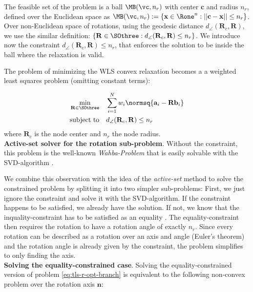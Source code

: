 The feasible set of the problem is a ball $\MB(\vc, n_r)$ with center $\mathbf{c}$ and radius $n_r$, defined over the Euclidean space as $\MB(\vc, n_r) :=\{\mathbf{x} \in \Rone^n : || \mathbf{c} - \mathbf{x}|| \leq n_r \}$. Over non-Euclidean space of rotations, using the geodesic distance $d_{\angle}(\mathbf{R}_c, \mathbf{R})$, we use the similar definition: $\{\mathbf{R} \in \SOthree : d_{\angle}(\mathbf{R}_c, \mathbf{R}) \leq n_r\}$. 
We introduce now the constraint 
$d_{\angle}(\mathbf{R}_c, \mathbf{R}) \leq n_r$, that enforces the solution to be inside the ball where the relaxation is valid. 

The problem of minimizing the WLS convex relaxation becomes a a weighted least squares problem (omitting constant terms):

\begin{equation}
	\label{eq:tls-r-opt-branch}
	\begin{aligned}
		\min_{\mathbf{R} \in \SOthree} \quad &\sum_{i=1}^{N} w_i \normsq{\mathbf{a}_i - \mathbf{R}\mathbf{b}_i}\\
		\text{subject to} \quad  &d_{\angle}(\mathbf{R}_c, \mathbf{R}) \leq n_r
	\end{aligned}
\end{equation}
where $\mathbf{R}_c$ is the node center and $n_r$ the node radius.\\
\textbf{Active-set solver for the rotation sub-problem}. Without the constraint, this problem is the well-known \textit{Wahba-Problem} that is easily solvable with the SVD-algorithm \cite{Kabsch-1976-Point-set-alignment} \cite{8594296} \cite{Lawrence2019APA} \cite{sorkine2017least}. 

We combine this observation with the idea of the \textit{active-set} method to solve the constrained problem by splitting it into two simpler sub-problems: First, we just ignore the constraint and solve it with the SVD-algorithm. If the constraint happens to be satisfied, we already have the solution. If not, we know that the inquality-constraint has to be satisfied as an equality \cite[p.467]{Numerical-Optimization-Nocedal-Wright}.
The equality-constraint then requires the rotation to have a rotation angle of exactly $n_r$. 
Since every rotation can be described as a rotation over an axis and angle (Euler's theorem) and the rotation angle is already given by the constraint, the problem simplifies to only finding the axis.\\
\textbf{Solving the equality-constrained case}.
Solving the equality-constrained version of problem \ref{eq:tls-r-opt-branch} is equivalent to the following non-convex problem over the rotation axis $\mathbf{n}$:

